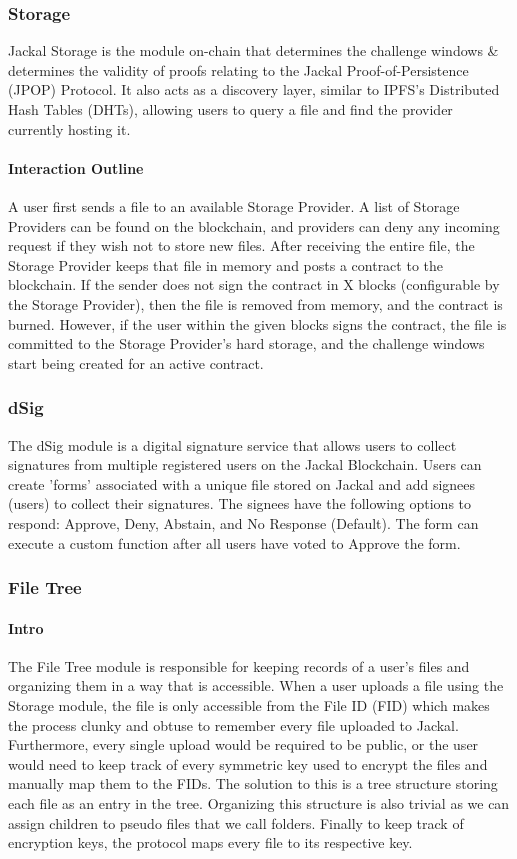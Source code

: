 \documentclass[a4paper]{article}
\begin{document}
\subsubsection{Storage}
Jackal Storage is the module on-chain that determines the challenge windows \& determines the validity of proofs relating to the Jackal Proof-of-Persistence (JPOP) Protocol. It also acts as a discovery layer, similar to IPFS's Distributed Hash Tables (DHTs), allowing users to query a file and find the provider currently hosting it. \cite{dht}


\paragraph{Interaction Outline}
A user first sends a file to an available Storage Provider. A list of Storage Providers can be found on the blockchain, and providers can deny any incoming request if they wish not to store new files. After receiving the entire file, the Storage Provider keeps that file in memory and posts a contract to the blockchain. If the sender does not sign the contract in X blocks (configurable by the Storage Provider), then the file is removed from memory, and the contract is burned. However, if the user within the given blocks signs the contract, the file is committed to the Storage Provider's hard storage, and the challenge windows start being created for an active contract.

\subsubsection{dSig}
The dSig module is a digital signature service that allows users to collect signatures from multiple registered users on the Jackal Blockchain. Users can create 'forms' associated with a unique file stored on Jackal and add signees (users) to collect their signatures. The signees have the following options to respond: Approve, Deny, Abstain, and No Response (Default). The form can execute a custom function after all users have voted to Approve the form.

\subsubsection{File Tree}
\paragraph{Intro}
The File Tree module is responsible for keeping records of a user's files and organizing them in a way that is accessible. When a user uploads a file using the Storage module, the file is only accessible from the File ID (FID) which makes the process clunky and obtuse to remember every file uploaded to Jackal. Furthermore, every single upload would be required to be public, or the user would need to keep track of every symmetric key used to encrypt the files and manually map them to the FIDs. The solution to this is a tree structure storing each file as an entry in the tree. Organizing this structure is also trivial as we can assign children to pseudo files that we call folders. Finally to keep track of encryption keys, the protocol maps every file to its respective key.
\end{document}
